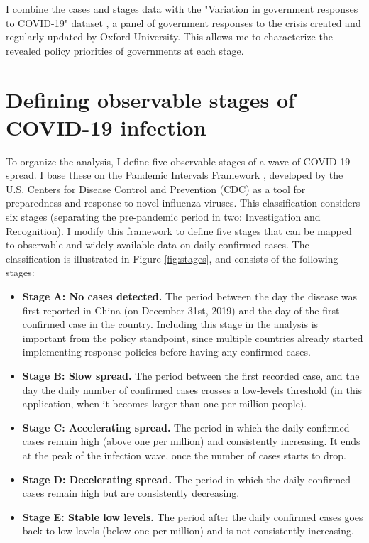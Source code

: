 \documentclass[12pt,english]{article}
\begin{document}
I combine the cases and stages data with the "Variation in government responses to COVID-19" dataset  \citep{Hale2020}, a panel of government responses to the crisis created and regularly updated by Oxford University.  This allows me to characterize the revealed policy priorities of governments at each stage.




\section{Defining observable stages of COVID-19 infection\label{sec:Stages}}

To organize the analysis, I define five observable stages of a wave of COVID-19 spread.  I base these on the Pandemic Intervals Framework \citep{Holloway2014}, developed by the U.S. Centers for Disease Control and Prevention (CDC) as a tool for preparedness and response to novel influenza viruses. This classification considers six stages (separating the pre-pandemic period in two: Investigation and Recognition).  I modify this framework to define five stages that can be mapped to observable and widely available data on daily confirmed cases. The classification is illustrated in Figure \ref{fig:stages}, and consists of the following stages:

\begin{itemize}
\item \textbf{Stage A: No cases detected.} The period between the day the disease was first reported in China (on December 31st, 2019) and the day of the first confirmed case in the country. Including this stage in the analysis is important from the policy standpoint, since multiple countries already started implementing response policies before having any confirmed cases.
\item \textbf{Stage B: Slow spread.} The period between the first recorded case, and the day the daily number of confirmed cases crosses a low-levels threshold (in this application, when it becomes larger than one per million people).
\item \textbf{Stage C: Accelerating spread.} The period in which the daily confirmed cases remain high (above one per million) and consistently increasing. It ends at the peak of the infection wave, once the number of cases starts to drop.
\item \textbf{Stage D: Decelerating spread.} The period in which the daily confirmed cases remain high but are consistently decreasing.
\item \textbf{Stage E: Stable low levels.} The period after the daily confirmed cases goes back to low levels (below one per million) and is not consistently increasing.
\end{itemize}
\end{document}
